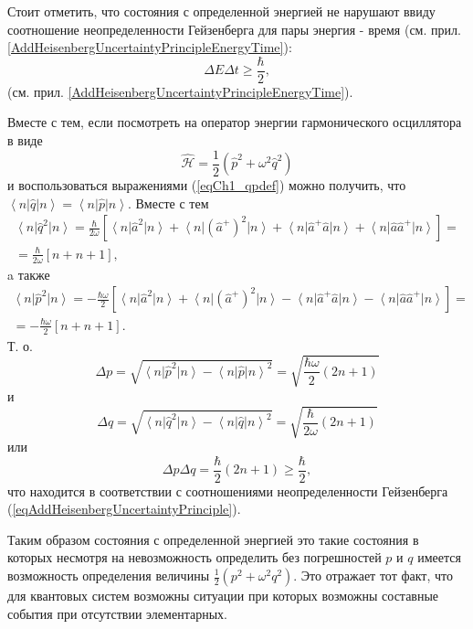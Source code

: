 \begin{remark}
  Стоит отметить, что состояния с определенной энергией не нарушают 
  ввиду соотношение неопределенности Гейзенберга для пары
  энергия - время
  (см. прил. \ref{AddHeisenbergUncertaintyPrincipleEnergyTime}):
  \[
  \Delta E \Delta t \ge \frac{\hbar}{2},
  \]
  (см. прил. \ref{AddHeisenbergUncertaintyPrincipleEnergyTime}).

  Вместе с тем, если посмотреть на оператор энергии гармонического
  осциллятора в виде
  \[
  \hat{\mathcal{H}} =\frac{1}{2} \left(\hat{p}^2 +
  \omega^2\hat{q}^2\right)
  \]
  и воспользоваться выражениями (\ref{eqCh1_qpdef}) можно получить,
  что $\left<n\right|\hat{q}\left|n\right> =
  \left<n\right|\hat{p}\left|n\right>$. Вместе с тем
  \begin{eqnarray}
    \left<n\right|\hat{q}^2\left|n\right> = \frac{\hbar}{2 \omega}
    \left[
      \left<n\right|\hat{a}^2\left|n\right> +
      \left<n\right|\left(\hat{a}^{+}\right)^2\left|n\right> +
      \left<n\right|\hat{a}^{+}\hat{a}\left|n\right> +
      \left<n\right|\hat{a}\hat{a}^{+}\left|n\right>
      \right] =
    \nonumber \\
    = \frac{\hbar}{2 \omega}
    \left[n + n + 1\right],
    \nonumber
  \end{eqnarray}
  a также
  \begin{eqnarray}
    \left<n\right|\hat{p}^2\left|n\right> = - \frac{\hbar \omega}{2}
    \left[
      \left<n\right|\hat{a}^2\left|n\right> +
      \left<n\right|\left(\hat{a}^{+}\right)^2\left|n\right> -
      \left<n\right|\hat{a}^{+}\hat{a}\left|n\right> -
      \left<n\right|\hat{a}\hat{a}^{+}\left|n\right>
      \right] =
    \nonumber \\
    = - \frac{\hbar \omega}{2}
    \left[n + n + 1\right].
    \nonumber
  \end{eqnarray}
  Т. о.
  \[
  \Delta p = \sqrt{\left<n\right|\hat{p}^2\left|n\right> -
    \left<n\right|\hat{p}\left|n\right>^2} =
  \sqrt{\frac{\hbar \omega}{2}\left(2n + 1\right)}
  \]
  и
  \[
  \Delta q = \sqrt{\left<n\right|\hat{q}^2\left|n\right> -
    \left<n\right|\hat{q}\left|n\right>^2} =
  \sqrt{\frac{\hbar}{2\omega}\left(2n + 1\right)}
  \]
  или
  \[
  \Delta p \Delta q = \frac{\hbar}{2}\left(2n + 1\right) \ge \frac{\hbar}{2},
  \]
  что находится в соответствии с соотношениями неопределенности
  Гейзенберга (\ref{eqAddHeisenbergUncertaintyPrinciple}).

  Таким образом состояния с определенной энергией это такие состояния
  в которых несмотря на невозможность определить без погрешностей $p$
  и $q$ имеется возможность определения величины 
  \(
  \frac{1}{2} \left(p^2 +
  \omega^2q^2\right)
  \). Это отражает тот факт, что для квантовых систем возможны
  ситуации при которых возможны составные события при отсутствии
  элементарных.


\end{remark}
